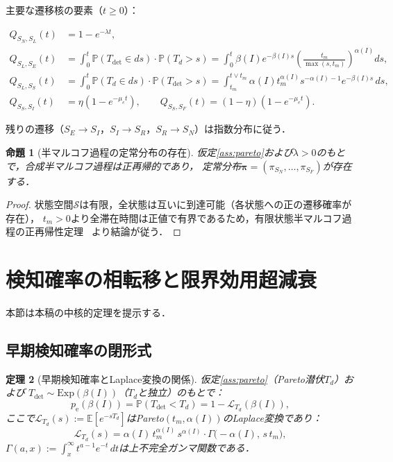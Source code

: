 \documentclass[12pt,a4paper]{article}
\theoremstyle{plain}
\newtheorem{theorem}{定理}[section]
\newtheorem{proposition}[theorem]{命題}
\theoremstyle{definition}
\theoremstyle{remark}
\newcommand{\E}{\mathbb{E}}
\newcommand{\Prob}{\mathbb{P}}
\newcommand{\calL}{\mathcal{L}}
\newcommand{\pe}{p_{\mathrm{e}}}
\newcommand{\Tdet}{T_{\mathrm{det}}}
\newcommand{\betaI}{\beta(I)}
\begin{document}
主要な遷移核の要素（$t\ge0$）：

\begin{align}
  Q_{S_N,S_L}(t) &= 1-e^{-\lambda t}, \label{eq:Q_NL}\\
  Q_{S_L,S_E}(t) &= \int_0^t\!\!
    \Prob(T_{\mathrm{det}}\in ds)\cdot\Prob(T_d>s)
    = \int_0^t\betaI e^{-\betaI s}\left(\frac{t_m}{\max(s,t_m)}\right)^{\alpha(I)}\!\!ds,
    \label{eq:Q_LE}\\
  Q_{S_L,S_S}(t) &= \int_0^t\!\!
    \Prob(T_d\in ds)\cdot\Prob(T_{\mathrm{det}}>s)
    = \int_{t_m}^{t\vee t_m}\!\!
    \alpha(I)t_m^{\alpha(I)}s^{-\alpha(I)-1}e^{-\betaI s}\,ds,
    \label{eq:Q_LS}\\
  Q_{S_S,S_I}(t) &= \eta(1-e^{-\mu_e t}),
    \qquad Q_{S_S,S_F}(t) = (1-\eta)(1-e^{-\mu_e t}).
    \label{eq:Q_SI_SF}
\end{align}

残りの遷移（$S_E\to S_I$，$S_I\to S_R$，$S_R\to S_N$）は指数分布に従う．

\begin{proposition}[半マルコフ過程の定常分布の存在]\label{prop:stationary}
仮定\ref{ass:pareto}および$\lambda>0$のもとで，合成半マルコフ過程は正再帰的であり，
定常分布$\bm\pi=(\pi_{S_N},\ldots,\pi_{S_F})$が存在する．
\end{proposition}

\begin{proof}
状態空間$\mathcal S$は有限，全状態は互いに到達可能（各状態への正の遷移確率が存在），
$t_m>0$より全滞在時間は正値で有界であるため，有限状態半マルコフ過程の正再帰性定理~\cite{limnios2001}
より結論が従う．
\end{proof}

\section{検知確率の相転移と限界効用超減衰}
\label{sec:phase}

本節は本稿の中核的定理を提示する．

\subsection{早期検知確率の閉形式}

\begin{theorem}[早期検知確率とLaplace変換の関係]\label{thm:pe_laplace}
仮定\ref{ass:pareto}（Pareto潜伏$T_d$）および
$T_{\mathrm{det}}\sim\mathrm{Exp}(\betaI)$（$T_d$と独立）のもとで：
\begin{equation}\label{eq:pe_formula}
  \pe(\betaI) = \Prob(\Tdet < T_d) = 1 - \calL_{T_d}(\betaI),
\end{equation}
ここで$\calL_{T_d}(s):=\E[e^{-sT_d}]$はPareto$(t_m,\alpha(I))$のLaplace変換であり：
\begin{equation}\label{eq:laplace_pareto}
  \calL_{T_d}(s) = \alpha(I)\,t_m^{\alpha(I)}\,s^{\alpha(I)}
  \cdot\Gamma\!\bigl(-\alpha(I),\,s\,t_m\bigr),
\end{equation}
$\Gamma(a,x):=\int_x^\infty t^{a-1}e^{-t}\,dt$は上不完全ガンマ関数である．
\end{theorem}
\end{document}
